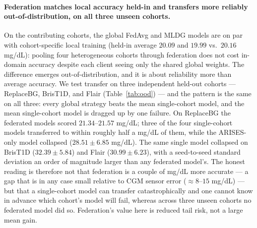 \documentclass[10pt,letterpaper]{article}
\begin{document}
\paragraph{Federation matches local accuracy held-in and transfers more reliably
out-of-distribution, on all three unseen cohorts.} On the contributing cohorts,
the global FedAvg and MLDG models are on par with cohort-specific local training
(held-in average $20.09$ and $19.99$ vs.\ $20.16$ mg/dL): pooling four
heterogeneous cohorts through federation does not cost in-domain accuracy despite
each client seeing only the shared global weights. The difference emerges
out-of-distribution, and it is about reliability more than average accuracy. We
test transfer on three independent held-out cohorts --- ReplaceBG, BrisT1D, and
Flair (Table~\ref{tab:ood}) --- and the pattern is the same on all three: every
global strategy beats the mean single-cohort model, and the mean single-cohort
model is dragged up by one failure. On ReplaceBG the federated models scored
$21.34$--$21.57$ mg/dL; three of the four single-cohort models transferred to
within roughly half a mg/dL of them, while the ARISES-only model collapsed
($28.51 \pm 6.85$ mg/dL). The same single model collapsed on BrisT1D
($32.39 \pm 5.84$) and Flair ($30.99 \pm 6.23$), with a seed-to-seed standard
deviation an order of magnitude larger than any federated model's. The honest
reading is therefore not that federation is a couple of mg/dL more accurate ---
a gap that is in any case small relative to CGM sensor error
($\approx 8$--$15$ mg/dL) --- but that a single-cohort model can transfer
catastrophically and one cannot know in advance which cohort's model will fail,
whereas across three unseen cohorts no federated model did so. Federation's value
here is reduced tail risk, not a large mean gain.
\end{document}
